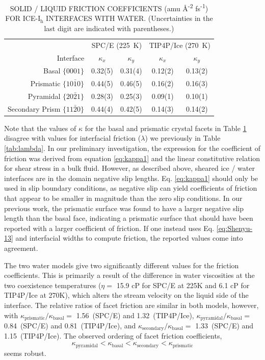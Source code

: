 \begin{table}[h]
\centering
\caption{SOLID / LIQUID FRICTION COEFFICIENTS (amu \AA\textsuperscript{-2} fs\textsuperscript{-1}) FOR
  ICE-I$_\mathrm{h}$ INTERFACES WITH WATER. (Uncertainties in the last digit are indicated with
  parentheses.)\label{tab:kappa}}
\begin{tabular}{|r|cc|cc|}  
  \toprule
  & \multicolumn{2}{c|}{SPC/E (225~K)} & \multicolumn{2}{c|}{TIP4P/Ice (270~K)} \\
  Interface & $\kappa_{x}$ &  $\kappa_{y}$ & $\kappa_{x}$ &  $\kappa_{y}$ \\ 
  \midrule
  Basal  $\{0001\}$                 & 0.32(5)  & 0.31(4) & 0.12(2)  & 0.13(2) \\
  Prismatic  $\{10\bar{1}0\}$       & 0.44(5)  & 0.46(5) & 0.16(2)  & 0.16(3) \\
  Pyramidal  $\{20\bar{2}1\}$       & 0.28(3)  & 0.25(3) & 0.09(1)  & 0.10(1) \\
  Secondary Prism  $\{11\bar{2}0\}$ & 0.44(4)  & 0.42(5) & 0.14(3)  & 0.14(2) \\ 
  \bottomrule
\end{tabular}
\end{table}

Note that the values of $\kappa$ for the basal and prismatic crystal
facets in Table \ref{tab:kappa} disagree with values for interfacial
friction ($\lambda$) we previously in Table \ref{tab:lambda}. In our
preliminary investigation, the expression for the coefficient of
friction was derived from equation \eqref{eq:kappa1} and the linear
constitutive relation for shear stress in a bulk fluid.  However, as
described above, sheared ice / water interfaces are in the domain
negative slip lengths. Eq. \eqref{eq:kappa1} should only be used in
slip boundary conditions, as negative slip can yield coefficients of
friction that appear to be smaller in magnitude than the zero slip
conditions. In our previous work, the prismatic surface was found to
have a larger negative slip length than the basal face, indicating a
prismatic surface that should have been reported with a larger
coefficient of friction. If one instead uses Eq. \eqref{eq:Shenyu-13}
and interfacial widths to compute friction, the reported values come
into agreement.

The two water models give two significantly different values for the
friction coefficients. This is primarily a result of the difference in
water viscosities at the two coexistence temperatures ($\eta = $ 15.9
cP for SPC/E at 225K and 6.1 cP for TIP4P/Ice at 270K), which alters
the stream velocity on the liquid side of the interface. The relative
ratios of facet friction are similar in both models, however, with
$\kappa_\mathrm{prismatic} / \kappa_\mathrm{basal} =$ 1.56~(SPC/E) and
1.32~(TIP4P/Ice),
$\kappa_\mathrm{pyramidal} / \kappa_\mathrm{basal} =$ 0.84~(SPC/E) and
0.81~(TIP4P/Ice), and
$\kappa_\mathrm{secondary} / \kappa_\mathrm{basal} =$ 1.33~(SPC/E) and
1.15~(TIP4P/Ice). The observed ordering of facet friction
coefficients,
\begin{equation}
\kappa_\mathrm{pyramidal} < \kappa_\mathrm{basal} <
\kappa_\mathrm{secondary} < \kappa_\mathrm{prismatic} 
\end{equation} 
seems robust.

